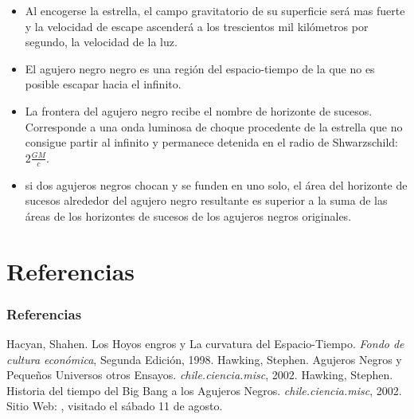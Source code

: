 \documentclass{beamer}
\begin{document}
\begin{frame}
 \begin{itemize}
  \item Al encogerse la estrella, el campo gravitatorio de su superficie será mas fuerte y la velocidad de escape ascenderá a los trescientos mil kilómetros por segundo, la velocidad de la luz.
  \item El agujero negro negro es una región del espacio-tiempo de la que no es posible escapar hacia el infinito.
  \item La frontera del agujero negro recibe el nombre de horizonte de sucesos. Corresponde a una onda luminosa de choque procedente de la estrella que no consigue partir al infinito y permanece detenida en el radio de Shwarzschild: $ 2 \frac{GM}{c}$.
  \item si dos agujeros negros chocan y se funden en uno solo, el área del horizonte de sucesos alrededor del agujero negro resultante es superior a la suma de las áreas de los horizontes de sucesos de los agujeros negros originales. 
 \end{itemize}
\end{frame}

\section{Referencias}
\begin{frame}[allowframebreacks]
\frametitle{Referencias}
\begin{thebibliography}{10}
  \beamertemplatebookbibitems
   Hacyan, Shahen.
    \newblock Los Hoyos engros y La curvatura del Espacio-Tiempo.
    \newblock \emph{Fondo de cultura económica}, Segunda Edición, 1998.
  \beamertemplatebookbibitems
   Hawking, Stephen.
    \newblock Agujeros Negros y Pequeños Universos  otros Ensayos.
    \newblock \emph{chile.ciencia.misc}, 2002.
  \beamertemplatebookbibitems
   Hawking, Stephen.
    \newblock Historia del tiempo del Big Bang a los Agujeros Negros.
    \newblock \emph{chile.ciencia.misc}, 2002.
  \beamertemplatearticlebibitems
   Sitio Web: \url{}, visitado el sábado 11 de agosto.
\end{thebibliography}
\end{frame}
\end{document}
